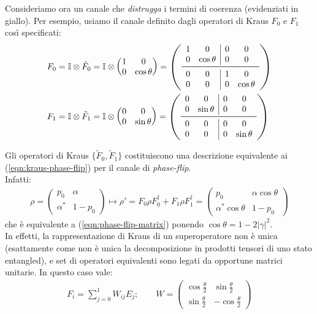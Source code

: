\documentclass[../../InformazioneQuantistica.tex]{subfiles}
\begin{document}
Consideriamo ora un canale che \textit{distrugga} i termini di coerenza (evidenziati in giallo). Per esempio, usiamo il canale definito dagli operatori di Kraus $F_0$ e $F_1$ così specificati:
\begin{align*}
F_0 &= \bb{I} \otimes \tilde{F}_0 = \bb{I}\otimes \begin{pmatrix} 1 & 0\\ 0 & \cos\theta\end{pmatrix} =
\left(
\begin{array}{cc|cc}
     1 & 0 & 0 & 0\\
     0 & \cos\theta & 0 & 0\\ \midrule
     0 & 0 & 1 & 0 \\
     0 & 0 & 0 & \cos\theta
\end{array}
\right)
\\
F_1 &= \bb{I}\otimes \tilde{F}_1 = \bb{I}\otimes \begin{pmatrix}0 & 0\\ 0 & \sin\theta\end{pmatrix} =
\left(
\begin{array}{cc|cc}
     0 & 0 & 0 & 0\\
     0 & \sin\theta & 0 & 0\\ \midrule
     0 & 0 & 0 & 0\\
     0 & 0 & 0 & \sin\theta
\end{array}
\right)
\end{align*}

\begin{expl}
Gli operatori di Kraus $\{\tilde{F}_0, \tilde{F}_1\}$ costituiscono una descrizione equivalente ai (\ref{eqn:kraus-phase-flip}) per il canale di \textit{phase-flip}.\\
Infatti:
\begin{align*}
    \rho = \begin{pmatrix}
    p_0 & \alpha\\
    \alpha^* & 1-p_0
    \end{pmatrix} \mapsto \rho' = F_0 \rho F_0^\dag + F_1 \rho F_1^\dag = \begin{pmatrix}
    p_0 & \alpha \cos\theta\\
    \alpha^* \cos\theta & 1-p_0
    \end{pmatrix}
\end{align*}
che è equivalente a (\ref{eqn:phase-flip-matrix}) ponendo $\cos\theta = 1-2|\gamma|^2$.\\
In effetti, la rappresentazione di Kraus di un superoperatore non è unica (esattamente come non è unica la decomposizione in prodotti tensori di uno stato entangled), e set di operatori equivalenti sono legati da opportune matrici unitarie. In questo caso vale:
\begin{align*}
    F_i = \sum_{j=0}^1 W_{ij} E_j; \qquad W = \begin{pmatrix}
    \cos\frac{\theta}{2} & \sin\frac{\theta}{2}\\
    \sin\frac{\theta}{2} & -\cos\frac{\theta}{2}
    \end{pmatrix}
\end{align*}

\end{expl}
\end{document}
